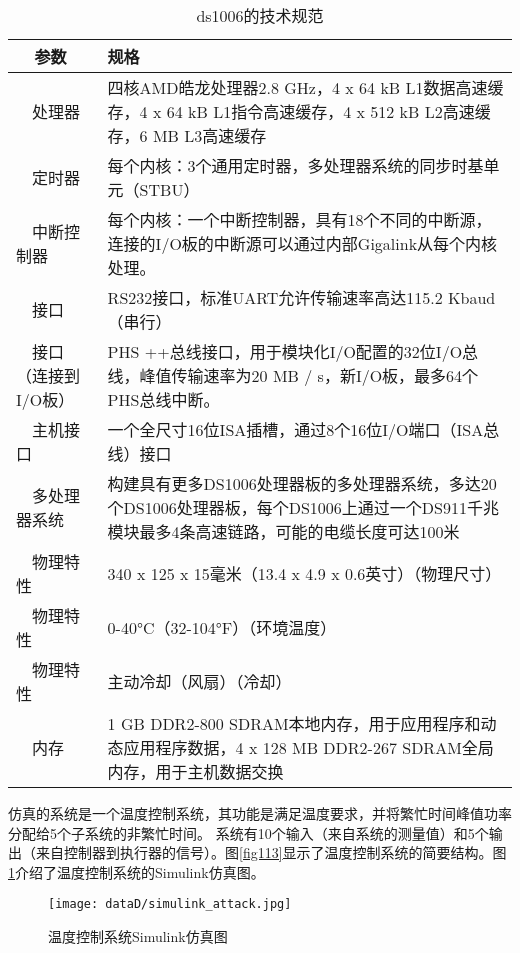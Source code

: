 \begin{table}[!htb]
\caption {ds1006的技术规范}
\label{algo:dspace}
\begin{tabular} {|p{2cm}|p{13cm}|} \hline \hline
  参数&规格\\ \hline
  处理器&四核AMD皓龙处理器2.8 GHz，4 x 64 kB L1数据高速缓存，4 x 64 kB L1指令高速缓存，4 x 512 kB L2高速缓存，6 MB L3高速缓存\\ \hline
  定时器&每个内核：3个通用定时器，多处理器系统的同步时基单元（STBU）\\ \hline
  中断控制器&每个内核：一个中断控制器，具有18个不同的中断源，连接的I/O板的中断源可以通过内部Gigalink从每个内核处理。 \\ \hline

  接口&RS232接口，标准UART允许传输速率高达115.2 Kbaud（串行）\\ \hline
  接口（连接到I/O板）&PHS ++总线接口，用于模块化I/O配置的32位I/O总线，峰值传输速率为20 MB / s，新I/O板，最多64个PHS总线中断。 \\ \hline

  主机接口&一个全尺寸16位ISA插槽，通过8个16位I/O端口（ISA总线）接口\\ \hline

  多处理器系统&构建具有更多DS1006处理器板的多处理器系统，多达20个DS1006处理器板，每个DS1006上通过一个DS911千兆模块最多4条高速链路，可能的电缆长度可达100米\\ \hline

  物理特性&340 x 125 x 15毫米（13.4 x 4.9 x 0.6英寸）（物理尺寸）\\ \hline
  物理特性&0-40°C（32-104°F）（环境温度）\\ \hline
  物理特性&主动冷却（风扇）（冷却）\\ \hline
  内存&1 GB DDR2-800 SDRAM本地内存，用于应用程序和动态应用程序数据，4 x 128 MB DDR2-267 SDRAM全局内存，用于主机数据交换\\ \hline\hline
\end{tabular}
\end{table}

仿真的系统是一个温度控制系统，其功能是满足温度要求，并将繁忙时间峰值功率分配给5个子系统的非繁忙时间。 系统有10个输入（来自系统的测量值）和5个输出（来自控制器到执行器的信号）。图\ref{fig113}显示了温度控制系统的简要结构。图\ref {fig114}介绍了温度控制系统的Simulink仿真图。

\begin{figure}[!htb]
	\centering
	\texttt{[image: dataD/simulink\_attack.jpg]}
	\caption{温度控制系统Simulink仿真图}
	\label{fig114}
\end{figure}
	
